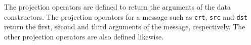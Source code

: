 \documentclass[a4paper,fleqn]{cas-dc}
\begin{document}
The projection operators are defined to return the arguments of the data constructors. The projection operators for a message such as \verb!crt!, \verb!src! and \verb!dst! return the first, second and third arguments of the message, respectively. 
The other projection operators 
are also defined likewise.
\end{document}
